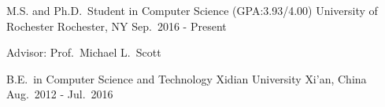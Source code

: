 

\begin{cventries}

  \cventry
    {M.S. and Ph.D.\ Student in Computer Science (GPA:3.93/4.00)} %
    {University of Rochester} %
    {Rochester, NY} %
    {Sep.\ 2016 - Present} %
    {
      \begin{cvitems} %
        \item {Advisor: Prof.\ Michael L.\ Scott}
      \end{cvitems}
    }

  \cventrys
    {B.E.\ in Computer Science and Technology} %
    {Xidian University} %
    {Xi'an, China} %
    {Aug.\ 2012 - Jul.\ 2016} %

\end{cventries}
